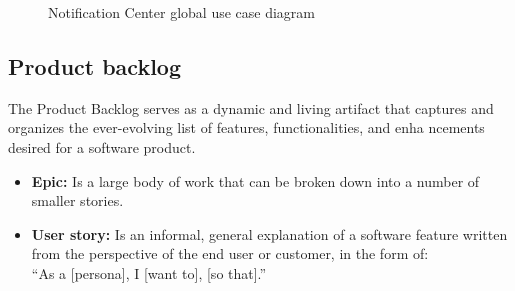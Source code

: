 \begin{figure}[hbt!]
      \centering
      
      \caption{Notification Center global use case diagram}
      \label{g-usecase}
\end{figure}

\subsection{Product backlog}
The Product Backlog serves as a dynamic and living artifact that captures and organizes the
ever-evolving list of features, functionalities, and enha   ncements desired for a software product.

\begin{itemize}
      \item \textbf{Epic:} Is a large body of work that can be broken down into a number of smaller stories.
      \item \textbf{User story:} Is an informal, general explanation of a software feature written from the
            perspective of the end user or customer, in the form of: \\ “As a [persona], I [want to], [so that].” \\
\end{itemize}

